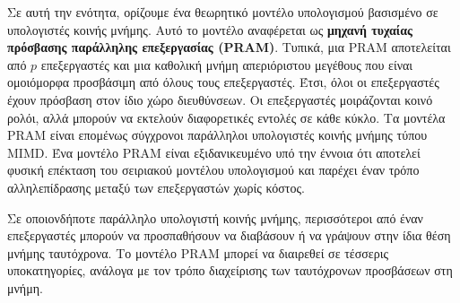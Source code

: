 \documentclass[12pt,a4paper]{article}
\begin{document}
Σε αυτή την ενότητα, ορίζουμε ένα θεωρητικό μοντέλο υπολογισμού βασισμένο σε
υπολογιστές κοινής μνήμης. Αυτό το μοντέλο αναφέρεται ως \textbf{μηχανή
τυχαίας πρόσβασης παράλληλης επεξεργασίας \foreignlanguage{english}{(PRAM)}}. 
Τυπικά, μια \foreignlanguage{english}{PRAM} αποτελείται από $p$ επεξεργαστές 
και μια καθολική μνήμη απεριόριστου μεγέθους που είναι ομοιόμορφα προσβάσιμη 
από όλους τους επεξεργαστές. Έτσι, όλοι οι επεξεργαστές έχουν πρόσβαση στον 
ίδιο χώρο διευθύνσεων. Οι επεξεργαστές μοιράζονται κοινό ρολόι, 
αλλά μπορούν να εκτελούν διαφορετικές εντολές σε κάθε κύκλο. Τα μοντέλα
\foreignlanguage{english}{PRAM} είναι επομένως σύγχρονοι παράλληλοι υπολογιστές κοινής μνήμης τύπου \foreignlanguage{english}{MIMD}.
Ένα μοντέλο \foreignlanguage{english}{PRAM} είναι εξιδανικευμένο υπό την έννοια ότι αποτελεί φυσική επέκταση
του σειριακού μοντέλου υπολογισμού και παρέχει έναν τρόπο αλληλεπίδρασης μεταξύ
των επεξεργαστών χωρίς κόστος.

Σε οποιονδήποτε παράλληλο υπολογιστή κοινής μνήμης, περισσότεροι από έναν
επεξεργαστές μπορούν να προσπαθήσουν να διαβάσουν ή να γράψουν στην ίδια θέση
μνήμης ταυτόχρονα. Το μοντέλο \foreignlanguage{english}{PRAM} μπορεί να διαιρεθεί σε τέσσερις υποκατηγορίες,
ανάλογα με τον τρόπο διαχείρισης των ταυτόχρονων προσβάσεων στη μνήμη.
\end{document}
